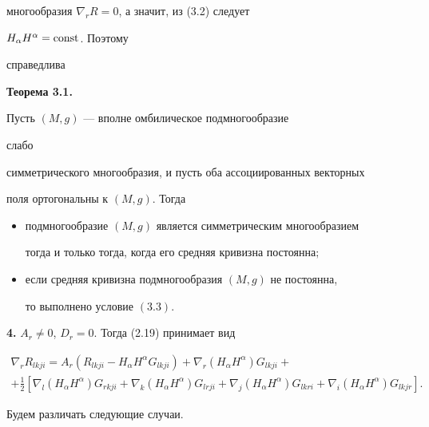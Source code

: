 многообразия $\nabla_r R=0$, а значит, из (3.2) следует


$H_\alpha H^\alpha=\operatorname{const}$. Поэтому


справедлива


\medskip





{\bf Теорема 3.1.} {\it


Пусть $(M,g)$ --- вполне омбилическое подмногообразие


слабо


симметрического многообразия, и пусть оба ассоциированных векторных


поля ортогональны к $(M,g)$. Тогда


\begin{itemize}


\item[1)] подмногообразие $(M,g)$ является симметрическим многообразием


тогда и только тогда, когда его средняя кривизна постоянна$;$


\item[2)] если средняя кривизна подмногообразия $(M,g)$ не постоянна,


то выполнено условие $(3.3)$.


\end{itemize}


}


\medskip





{\bf 4.} $A_r\ne 0$, $D_r=0$. Тогда (2.19) принимает вид


\begin{multline}


\nabla_r R_{lkji}=A_r(R_{lkji}-H_\alpha H^\alpha


G_{lkji})+\nabla_r(H_\alpha H^\alpha)


G_{lkji}+ \\


+\frac{1}{2}[\nabla_l(H_\alpha H^\alpha)G_{rkji}+


\nabla_k(H_\alpha H^\alpha)G_{lrji}+


\nabla_j(H_\alpha H^\alpha)G_{lkri}+


\nabla_i(H_\alpha H^\alpha)G_{lkjr}].\tag{4.1}


\end{multline}





Будем различать следующие случаи.


